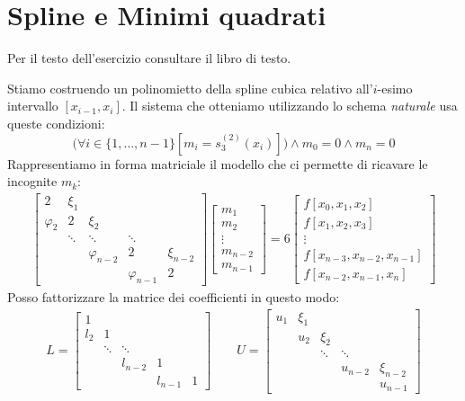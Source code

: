 \section{Spline e Minimi quadrati}

\begin{exercise}[4.16] 
Per il testo dell'esercizio consultare il libro di testo.
\end{exercise} 
Stiamo costruendo un polinomietto della spline cubica relativo all'$i$-esimo
intervallo $[x_{i-1}, x_{i}]$. Il sistema che otteniamo utilizzando lo schema 
\emph{naturale} usa queste condizioni:
\begin{displaymath}
	\big (\forall i \in \{1,\ldots, n-1\}[m_{i} = s_{3}^{(2)}(x_{i})]\big ) \wedge
	m_{0} = 0 \wedge m_{n} = 0
\end{displaymath}
Rappresentiamo in forma matriciale il modello che ci permette di ricavare le
incognite $m_{k}$:
\begin{displaymath}
\begin{split}
	\begin{bmatrix}
		2 & \xi_{1} \\
		\varphi_{2} & 2 & \xi_{2} \\
			&	\ddots &	\ddots & \ddots \\
			&	&	\varphi_{n-2} & 2 & \xi_{n-2} \\
			&	&	& \varphi_{n-1} & 2
	\end{bmatrix} %
	\begin{bmatrix}
		m_{1} \\
		m_{2} \\
		\vdots \\
		m_{n-2} \\
		m_{n-1}
	\end{bmatrix} = 6 %
	\begin{bmatrix}
		f[x_{0}, x_{1}, x_{2}] \\
		f[x_{1}, x_{2}, x_{3}] \\
		\vdots \\
		f[x_{n-3}, x_{n-2}, x_{n-1}] \\
		f[x_{n-2}, x_{n-1}, x_{n}]
	\end{bmatrix} 
\end{split}
\end{displaymath}
Posso fattorizzare la matrice dei coefficienti in questo modo:
\begin{displaymath}
\begin{split}
	L = \begin{bmatrix}
		1 \\
		l_{2} & 1  \\
			&	\ddots &	\ddots \\
			&	&	l_{n-2} & 1 \\
			&	&	& l_{n-1} & 1
	\end{bmatrix} \quad \quad
	U = \begin{bmatrix}
		u_{1} & \xi_{1}\\
		 & u_{2} & \xi_{2} \\
			&	&	\ddots	& \ddots \\
			&	&	& u_{n-2}	& \xi_{n-2} \\
			&	&	&  & u_{n-1}
	\end{bmatrix} 
\end{split}
\end{displaymath}
